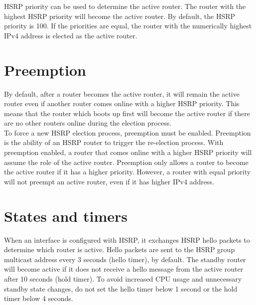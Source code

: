 HSRP priority can be used to determine the active router. The router with the highest HSRP priority will become the active router. By default, the HSRP priority is 100. If the priorities are equal, the router with the numerically highest IPv4 address is elected as the active router.

\section{Preemption}

By default, after a router becomes the active router, it will remain the active router even if another router comes online with a higher HSRP priority. This means that the router which boots up first will become the active router if there are no other routers online during the election process.\\

To force a new HSRP election process, preemption must be enabled. Preemption is the ability of an HSRP router to trigger the re-election process. With preemption enabled, a router that comes online with a higher HSRP priority will assume the role of the active router. Preemption only allows a router to become the active router if it has a higher priority. However, a router with equal priority will not preempt an active router, even if it has higher IPv4 address.

\section{States and timers}

When an interface is configured with HSRP, it exchanges HSRP hello packets to determine which router is active. Hello packets are sent to the HSRP group multicast address every 3 seconds (hello timer), by default. The standby router will become active if it does not receive a hello message from the active router after 10 seconds (hold timer). To avoid increased CPU usage and unnecessary standby state changes, do not set the hello timer below 1 second or the hold timer below 4 seconds.

